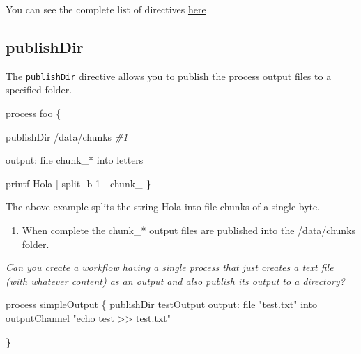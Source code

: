 \documentclass[
]{book}
\newenvironment{Shaded}{\begin{snugshade}}{\end{snugshade}}
\newcommand{\CommentTok}[1]{\textcolor[rgb]{0.56,0.35,0.01}{\textit{#1}}}
\newcommand{\ErrorTok}[1]{\textcolor[rgb]{0.64,0.00,0.00}{\textbf{#1}}}
\newcommand{\ExtensionTok}[1]{#1}
\newcommand{\FunctionTok}[1]{\textcolor[rgb]{0.00,0.00,0.00}{#1}}
\newcommand{\NormalTok}[1]{#1}
\newcommand{\StringTok}[1]{\textcolor[rgb]{0.31,0.60,0.02}{#1}}
\providecommand{\tightlist}{%
  \setlength{\itemsep}{0pt}\setlength{\parskip}{0pt}}
\begin{document}
You can see the complete list of directives \href{https://www.nextflow.io/docs/latest/process.html\#directives}{here}

\hypertarget{publishdir}{%
\subsection{publishDir}\label{publishdir}}

The \texttt{publishDir} directive allows you to publish the process output files to a specified folder.

\begin{Shaded}
\begin{Highlighting}[numbers=left,,]
\ExtensionTok{process}\NormalTok{ foo \{}

    \ExtensionTok{publishDir} \StringTok{\textquotesingle{}/data/chunks\textquotesingle{}} \CommentTok{\#1}

    \ExtensionTok{output:}
    \FunctionTok{file} \StringTok{\textquotesingle{}chunk\_*\textquotesingle{}}\NormalTok{ into letters}

    \StringTok{\textquotesingle{}\textquotesingle{}\textquotesingle{}}
\StringTok{    printf \textquotesingle{}}\ExtensionTok{Hola}\StringTok{\textquotesingle{} | split {-}b 1 {-} chunk\_}
\StringTok{    \textquotesingle{}\textquotesingle{}\textquotesingle{}}
\ErrorTok{\}}
\end{Highlighting}
\end{Shaded}

The above example splits the string Hola into file chunks of a single byte.

\begin{enumerate}
\def\labelenumi{\arabic{enumi}.}
\tightlist
\item
  When complete the chunk\_* output files are published into the /data/chunks folder.
\end{enumerate}

\emph{Can you create a workflow having a single process that just creates a text file (with whatever content) as an output and also publish its output to a directory?}

\begin{Shaded}
\begin{Highlighting}[numbers=left,,]
\ExtensionTok{process}\NormalTok{ simpleOutput \{}
\ExtensionTok{publishDir} \StringTok{\textquotesingle{}testOutput\textquotesingle{}}
\ExtensionTok{output:}
\FunctionTok{file} \StringTok{"test.txt"}\NormalTok{ into outputChannel}
\StringTok{"echo test \textgreater{}\textgreater{} test.txt"}

\ErrorTok{\}}
\end{Highlighting}
\end{Shaded}
\end{document}
